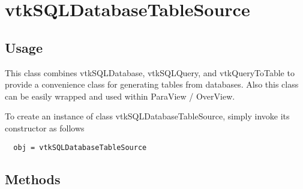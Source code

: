 \section{vtkSQLDatabaseTableSource}

\subsection{Usage}

 This class combines vtkSQLDatabase, vtkSQLQuery, and vtkQueryToTable to
 provide a convenience class for generating tables from databases. 
 Also this class can be easily wrapped and used within ParaView / OverView.

To create an instance of class vtkSQLDatabaseTableSource, simply
invoke its constructor as follows
\begin{verbatim}
  obj = vtkSQLDatabaseTableSource
\end{verbatim}
\subsection{Methods}

